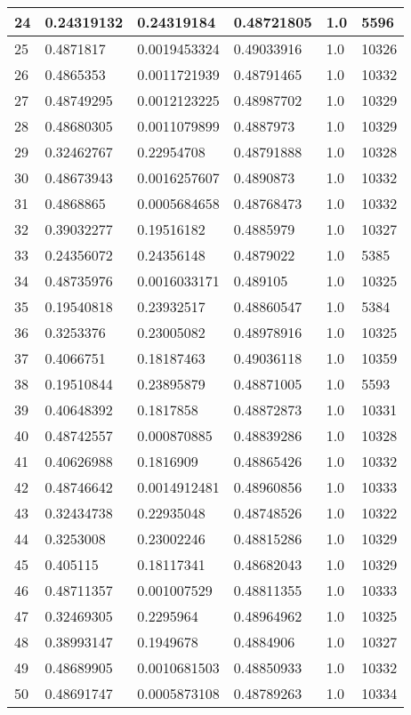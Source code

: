 \begin{longtable}{|l|l|l|l|l|l|}
24 & 0.24319132 & 0.24319184 & 0.48721805 & 1.0 & 5596 \\ \hline 
25 & 0.4871817 & 0.0019453324 & 0.49033916 & 1.0 & 10326 \\ \hline 
26 & 0.4865353 & 0.0011721939 & 0.48791465 & 1.0 & 10332 \\ \hline 
27 & 0.48749295 & 0.0012123225 & 0.48987702 & 1.0 & 10329 \\ \hline 
28 & 0.48680305 & 0.0011079899 & 0.4887973 & 1.0 & 10329 \\ \hline 
29 & 0.32462767 & 0.22954708 & 0.48791888 & 1.0 & 10328 \\ \hline 
30 & 0.48673943 & 0.0016257607 & 0.4890873 & 1.0 & 10332 \\ \hline 
31 & 0.4868865 & 0.0005684658 & 0.48768473 & 1.0 & 10332 \\ \hline 
32 & 0.39032277 & 0.19516182 & 0.4885979 & 1.0 & 10327 \\ \hline 
33 & 0.24356072 & 0.24356148 & 0.4879022 & 1.0 & 5385 \\ \hline 
34 & 0.48735976 & 0.0016033171 & 0.489105 & 1.0 & 10325 \\ \hline 
35 & 0.19540818 & 0.23932517 & 0.48860547 & 1.0 & 5384 \\ \hline 
36 & 0.3253376 & 0.23005082 & 0.48978916 & 1.0 & 10325 \\ \hline 
37 & 0.4066751 & 0.18187463 & 0.49036118 & 1.0 & 10359 \\ \hline 
38 & 0.19510844 & 0.23895879 & 0.48871005 & 1.0 & 5593 \\ \hline 
39 & 0.40648392 & 0.1817858 & 0.48872873 & 1.0 & 10331 \\ \hline 
40 & 0.48742557 & 0.000870885 & 0.48839286 & 1.0 & 10328 \\ \hline 
41 & 0.40626988 & 0.1816909 & 0.48865426 & 1.0 & 10332 \\ \hline 
42 & 0.48746642 & 0.0014912481 & 0.48960856 & 1.0 & 10333 \\ \hline 
43 & 0.32434738 & 0.22935048 & 0.48748526 & 1.0 & 10322 \\ \hline 
44 & 0.3253008 & 0.23002246 & 0.48815286 & 1.0 & 10329 \\ \hline 
45 & 0.405115 & 0.18117341 & 0.48682043 & 1.0 & 10329 \\ \hline 
46 & 0.48711357 & 0.001007529 & 0.48811355 & 1.0 & 10333 \\ \hline 
47 & 0.32469305 & 0.2295964 & 0.48964962 & 1.0 & 10325 \\ \hline 
48 & 0.38993147 & 0.1949678 & 0.4884906 & 1.0 & 10327 \\ \hline 
49 & 0.48689905 & 0.0010681503 & 0.48850933 & 1.0 & 10332 \\ \hline 
50 & 0.48691747 & 0.0005873108 & 0.48789263 & 1.0 & 10334 \\ \hline 
\end{longtable}